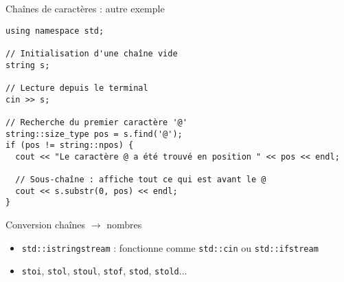\documentclass[c]{beamer}
\newcommand{\inline}[1]{\texttt{#1}}
\begin{document}

\begin{frame}[fragile]{Chaînes de caractères : autre exemple}

\begin{verbatim}
using namespace std;

// Initialisation d'une chaîne vide
string s;

// Lecture depuis le terminal
cin >> s;

// Recherche du premier caractère '@'
string::size_type pos = s.find('@');
if (pos != string::npos) {
  cout << "Le caractère @ a été trouvé en position " << pos << endl;

  // Sous-chaîne : affiche tout ce qui est avant le @
  cout << s.substr(0, pos) << endl;
}

\end{verbatim}

\end{frame}


\begin{frame}[fragile]{Conversion chaînes $\rightarrow$ nombres}

\begin{itemize}

\item \inline{std::istringstream} : fonctionne comme \inline{std::cin} ou \inline{std::ifstream}

\item \texttt{stoi}, \texttt{stol}, \texttt{stoul}, \texttt{stof}, \texttt{stod}, \texttt{stold}...

\end{itemize}

\end{frame}

\end{document}
